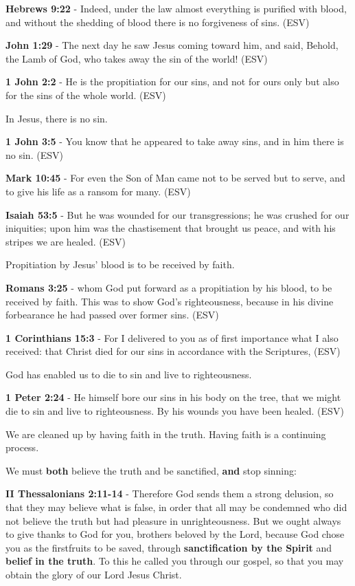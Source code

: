 \documentclass[11pt]{article}
\begin{document}
\textbf{Hebrews 9:22} - Indeed, under the law almost everything is purified with blood, and without the shedding of blood there is no forgiveness of sins.  (ESV)

\textbf{John 1:29} - The next day he saw Jesus coming toward him, and said, Behold, the Lamb of God, who takes away the sin of the world!  (ESV)

\textbf{1 John 2:2} - He is the propitiation for our sins, and not for ours only but also for the sins of the whole world.  (ESV)

In Jesus, there is no sin.

\textbf{1 John 3:5} - You know that he appeared to take away sins, and in him there is no sin.  (ESV)

\textbf{Mark 10:45} -  For even the Son of Man came not to be served but to serve, and to give his life as a ransom for many.  (ESV)

\textbf{Isaiah 53:5} -  But he was wounded for our transgressions; he was crushed for our iniquities; upon him was the chastisement that brought us peace, and with his stripes we are healed.  (ESV)

Propitiation by Jesus' blood is to be received by faith.

\textbf{Romans 3:25} -  whom God put forward as a propitiation by his blood, to be received by faith.  This was to show God's righteousness, because in his divine forbearance he had passed over former sins.  (ESV)

\textbf{1 Corinthians 15:3} -  For I delivered to you as of first importance what I also received: that Christ died for our sins in accordance with the Scriptures,  (ESV)

God has enabled us to die to sin and live to righteousness.

\textbf{1 Peter 2:24} -  He himself bore our sins in his body on the tree, that we might die to sin and live to righteousness.  By his wounds you have been healed.  (ESV)

We are cleaned up by having faith in the truth. Having faith is a continuing process.

We must \textbf{both} believe the truth and be sanctified, \textbf{and} stop sinning:

\textbf{II Thessalonians 2:11-14} - Therefore God sends them a strong delusion, so that they may believe what is false, in order that all may be condemned who did not believe the truth but had pleasure in unrighteousness. But we ought always to give thanks to God for you, brothers beloved by the Lord, because God chose you as the firstfruits to be saved, through \textbf{sanctification by the Spirit} and \textbf{belief in the truth}. To this he called you through our gospel, so that you may obtain the glory of our Lord Jesus Christ.
\end{document}
